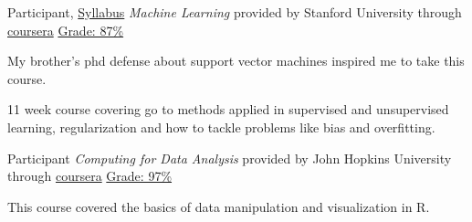 

\begin{cventries}

\cventry
  {Participant, \href{https://www.coursera.org/learn/machine-learning\#syllabus}{Syllabus}} %
  {\textit{Machine Learning} provided by Stanford University through \href{https://www.coursera.org/learn/machine-learning}{coursera}}
  {\href{https://www.coursera.org/api/legacyCertificates.v1/spark/statementOfAccomplishment/971489~4383751/pdf}{Grade: 87\%}} %
  {} %
  {
    \begin{cvitems} %
      \item {My brother's phd defense about support vector machines inspired me to take this course.}
      \item {11 week course covering go to methods applied in supervised and unsupervised learning, regularization and how to tackle problems like bias and overfitting.}
    \end{cvitems}
  }

\cventry
  {Participant} %
  {\textit{Computing for Data Analysis} provided by John Hopkins University through \href{https://www.coursera.org}{coursera}} %
  {\href{https://www.coursera.org/api/legacyCertificates.v1/spark/statementOfAccomplishment/970940~4383751/pdf}{Grade: 97\%}} %
  {} %
  {
    \begin{cvitems} %
      \item {This course covered the basics of data manipulation and visualization in R.}
    \end{cvitems}
  }


\end{cventries}
